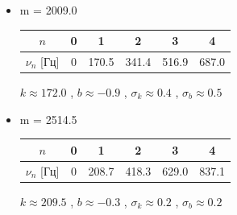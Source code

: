 \documentclass[8pt]{article}
\begin{document}
\begin{itemize}
        \item m = 2009.0
                    \begin{center}
                    \begin{tabular}{|c|c|c|c|c|c|}
                            \hline 
                                $n$ & 0 & 1 & 2 & 3 & 4  \\
                            \hline
                                $\nu_n$ [Гц] &0&170.5&341.4&516.9&687.0\\
                            \hline
                    \end{tabular}
                    \end{center}
            $k \approx 172.0$  , $b \approx -0.9$ , $\sigma_k \approx 0.4 $ , $\sigma_b \approx 0.5$ \\

        \item m = 2514.5
                    \begin{center}
                    \begin{tabular}{|c|c|c|c|c|c|}
                            \hline 
                                $n$ & 0 & 1 & 2 & 3 & 4  \\
                            \hline
                                $\nu_n$ [Гц] &0&208.7&418.3&629.0&837.1\\
                            \hline
                    \end{tabular}
                    \end{center}
            $k \approx 209.5$  , $b \approx -0.3$ , $\sigma_k \approx 0.2$ , $\sigma_b \approx 0.2$ \\
    \end{itemize}
    
\end{document}
